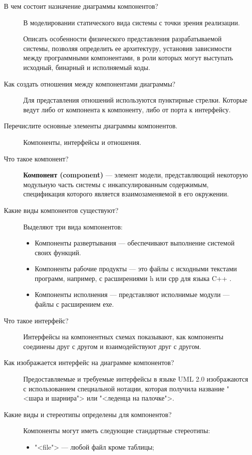 \begin{description}
	\item [В чем состоит назначение диаграммы компонентов?]
		В моделировании статического вида системы с точки зрения реализации.

		Описать особенности физического представления разрабатываемой системы,
		позволяя определить ее архитектуру, установив зависимости между
		программными компонентами, в роли которых могут выступать исходный,
		бинарный и исполняемый коды.
	\item [Как создать отношения между компонентами диаграммы?]
		Для представления отношений используются пунктирные стрелки.
		Которые ведут либо от компонента к компоненту,
		либо от порта к интерфейсу.
	\item [Перечислите основные элементы диаграммы компонентов.]
		Компоненты, интерфейсы и отношения.
	\item [Что такое компонент?]
		\textbf{Компонент (component)} --- элемент модели,
		представляющий некоторую
		модульную часть системы с инкапсулированным содержимым, спецификация
		которого является взаимозаменяемой в его окружении.
	\item [Какие виды компонентов существуют?]
		Выделяют три вида компонентов:
		\begin{itemize}
			\item Компоненты развертывания --- обеспечивают
				выполнение системой своих функций.
			\item Компоненты рабочие продукты --- это файлы
				с исходными текстами программ, например,
				с расширениями h или срр для языка C++ .
			\item Компоненты исполнения --- представляют исполнимые
				модули --- файлы с расширением ехе.
		\end{itemize}
	\item [Что такое интерфейс?]
		Интерфейсы на компонентных схемах показывают, как компоненты
		соединены друг с другом и взаимодействуют друг с другом.
	\item [Как изображается интерфейс на диаграмме компонентов?]
		Предоставляемые и требуемые интерфейсы в языке UML 2.0 изображаются
		с использованием специальной нотации, которая получила название
		"<шара и шарнира"> или "<леденца на палочке">.
	\item [Какие виды и стереотипы определены для компонентов?]
		Компоненты могут иметь следующие стандартные стереотипы:
		\begin{itemize}
			\item "<file"> --- любой файл кроме таблицы;

\end{itemize}
\end{description}
